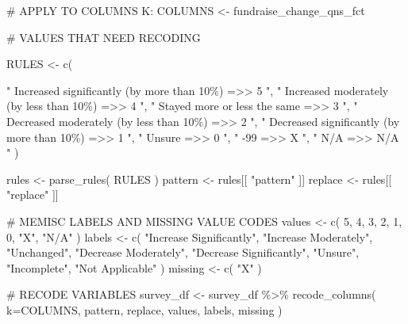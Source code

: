 \documentclass[
  letterpaper,
]{scrbook}
\newenvironment{Shaded}{\begin{snugshade}}{\end{snugshade}}
\newcommand{\AttributeTok}[1]{\textcolor[rgb]{0.40,0.45,0.13}{#1}}
\newcommand{\CommentTok}[1]{\textcolor[rgb]{0.37,0.37,0.37}{#1}}
\newcommand{\DecValTok}[1]{\textcolor[rgb]{0.68,0.00,0.00}{#1}}
\newcommand{\FunctionTok}[1]{\textcolor[rgb]{0.28,0.35,0.67}{#1}}
\newcommand{\NormalTok}[1]{\textcolor[rgb]{0.00,0.23,0.31}{#1}}
\newcommand{\OtherTok}[1]{\textcolor[rgb]{0.00,0.23,0.31}{#1}}
\newcommand{\SpecialCharTok}[1]{\textcolor[rgb]{0.37,0.37,0.37}{#1}}
\newcommand{\StringTok}[1]{\textcolor[rgb]{0.13,0.47,0.30}{#1}}
\begin{document}
\begin{Shaded}
\begin{Highlighting}[]
\CommentTok{\# APPLY TO COLUMNS K:}
\NormalTok{COLUMNS }\OtherTok{\textless{}{-}}\NormalTok{  fundraise\_change\_qns\_fct}

\CommentTok{\# VALUES THAT NEED RECODING}

\NormalTok{RULES }\OtherTok{\textless{}{-}} \FunctionTok{c}\NormalTok{(    }
          
     \StringTok{"   Increased significantly (by more than 10\%)    =\textgreater{}\textgreater{}     5   "}\NormalTok{,}
     \StringTok{"      Increased moderately (by less than 10\%)    =\textgreater{}\textgreater{}     4   "}\NormalTok{,}
     \StringTok{"                 Stayed more or less the same    =\textgreater{}\textgreater{}     3   "}\NormalTok{,}
     \StringTok{"      Decreased moderately (by less than 10\%)    =\textgreater{}\textgreater{}     2   "}\NormalTok{,}
     \StringTok{"   Decreased significantly (by more than 10\%)    =\textgreater{}\textgreater{}     1   "}\NormalTok{,}
     \StringTok{"                                       Unsure    =\textgreater{}\textgreater{}     0   "}\NormalTok{,}
     \StringTok{"                                          {-}99    =\textgreater{}\textgreater{}     X   "}\NormalTok{,}
     \StringTok{"                                          N/A    =\textgreater{}\textgreater{}   N/A   "}\NormalTok{  )}
 
\NormalTok{rules }\OtherTok{\textless{}{-}} \FunctionTok{parse\_rules}\NormalTok{( RULES )          }
\NormalTok{pattern }\OtherTok{\textless{}{-}}\NormalTok{ rules[[ }\StringTok{"pattern"}\NormalTok{ ]]}
\NormalTok{replace }\OtherTok{\textless{}{-}}\NormalTok{ rules[[ }\StringTok{"replace"}\NormalTok{ ]]}

\CommentTok{\# MEMISC LABELS AND MISSING VALUE CODES }
\NormalTok{values  }\OtherTok{\textless{}{-}} \FunctionTok{c}\NormalTok{( }\DecValTok{5}\NormalTok{, }\DecValTok{4}\NormalTok{, }\DecValTok{3}\NormalTok{, }\DecValTok{2}\NormalTok{, }\DecValTok{1}\NormalTok{, }\DecValTok{0}\NormalTok{, }\StringTok{"X"}\NormalTok{, }\StringTok{"N/A"}\NormalTok{ )}
\NormalTok{labels  }\OtherTok{\textless{}{-}} \FunctionTok{c}\NormalTok{( }\StringTok{"Increase Significantly"}\NormalTok{, }\StringTok{"Increase Moderately"}\NormalTok{, }
              \StringTok{"Unchanged"}\NormalTok{, }\StringTok{"Decrease Moderately"}\NormalTok{, }\StringTok{"Decrease Significantly"}\NormalTok{, }
              \StringTok{"Unsure"}\NormalTok{, }\StringTok{"Incomplete"}\NormalTok{, }\StringTok{"Not Applicable"}\NormalTok{ )}
\NormalTok{missing }\OtherTok{\textless{}{-}} \FunctionTok{c}\NormalTok{( }\StringTok{"X"}\NormalTok{ )}

\CommentTok{\# RECODE VARIABLES }
\NormalTok{survey\_df }\OtherTok{\textless{}{-}} 
\NormalTok{  survey\_df }\SpecialCharTok{\%\textgreater{}\%} 
  \FunctionTok{recode\_columns}\NormalTok{( }\AttributeTok{k=}\NormalTok{COLUMNS, pattern, replace, values, labels, missing )}
\end{Highlighting}
\end{Shaded}
\end{document}
